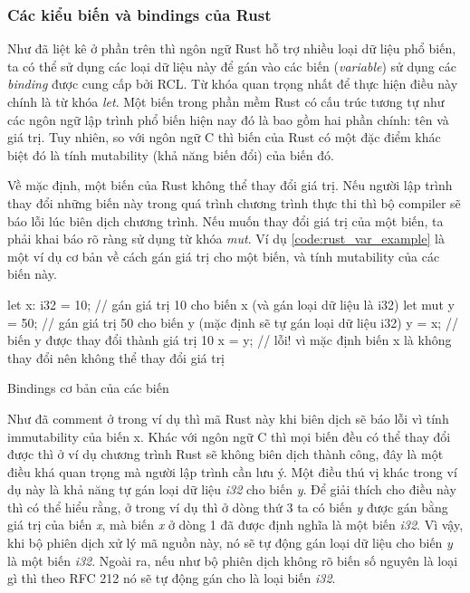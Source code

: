 \subsubsection{Các kiểu biến và bindings của Rust}
Như đã liệt kê ở phần trên thì ngôn ngữ Rust hỗ trợ nhiều loại dữ liệu phổ biến, ta có thể sử dụng các loại dữ liệu này để gán vào các biến (\emph{variable}) sử dụng các \emph{binding} được cung cấp bởi RCL.
Từ khóa quan trọng nhất để thực hiện điều này chính là từ khóa \emph{let}.
Một biến trong phần mềm Rust có cấu trúc tương tự như các ngôn ngữ lập trình phổ biến hiện nay đó là bao gồm hai phần chính: tên và giá trị.
Tuy nhiên, so với ngôn ngữ C thì biến của Rust có một đặc điểm khác biệt đó là tính mutability (khả năng biến đổi) của biến đó.

Về mặc định, một biến của Rust không thể thay đổi giá trị.
Nếu người lập trình thay đổi những biến này trong quá trình chương trình thực thi thì bộ compiler sẽ báo lỗi lúc biên dịch chương trình.
Nếu muốn thay đổi giá trị của một biến, ta phải khai báo rõ ràng sử dụng từ khóa \emph{mut}.
Ví dụ \ref{code:rust_var_example} là một ví dụ cơ bản về cách gán giá trị cho một biến, và tính mutability của các biến này.

\begin{listing}
\begin{rustcode}
let x: i32 = 10; // gán giá trị 10 cho biến x (và gán loại dữ liệu là i32)
let mut y = 50; // gán giá trị 50 cho biến y (mặc định sẽ tự gán loại dữ liệu i32)
y = x; // biến y được thay đổi thành giá trị 10
x = y; // lỗi! vì mặc định biến x là không thay đổi nên không thể thay đổi giá trị
\end{rustcode}
\caption{Bindings cơ bản của các biến}
\label{code:rust_var_example}
\end{listing}

Như đã comment ở trong ví dụ thì mã Rust này khi biên dịch sẽ báo lỗi vì tính immutability của biến x.
Khác với ngôn ngữ C thì mọi biến đều có thể thay đổi được thì ở ví dụ chương trình Rust sẽ không biên dịch thành công, đây là một điều khá quan trọng mà người lập trình cần lưu ý.
Một điều thú vị khác trong ví dụ này là khả năng tự gán loại dữ liệu \emph{i32} cho biến \emph{y}.
Để giải thích cho điều này thì có thể hiểu rằng, ở trong ví dụ thì ở dòng thứ 3 ta có biến \emph{y} được gán bằng giá trị của biến \emph{x}, mà biến \emph{x} ở dòng 1 đã được định nghĩa là một biến \emph{i32}.
Vì vậy, khi bộ phiên dịch xử lý mã nguồn này, nó sẽ tự động gán loại dữ liệu cho biến \emph{y} là một biến \emph{i32}.
Ngoài ra, nếu như bộ phiên dịch không rõ biến số nguyên là loại gì thì theo RFC 212 nó sẽ tự động gán cho là loại biến \emph{i32}.

